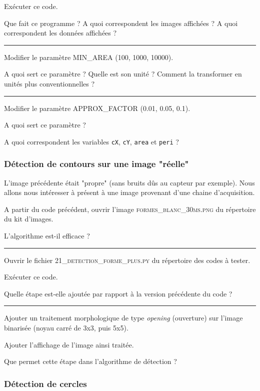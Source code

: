 \documentclass[a4paper,11pt,titlepage]{article} %
\begin{document}
\Manip Exécuter ce code.

\Quest Que fait ce programme ? A quoi correspondent les images affichées ? A quoi correspondent les données affichées ?

\noindent \rule{\linewidth}{1pt}

\Manip Modifier le paramètre MIN\_AREA (100, 1000, 10000).

\Quest A quoi sert ce paramètre ? Quelle est son unité ? Comment la transformer en unités plus conventionnelles ?

\noindent \rule{\linewidth}{1pt}

\Manip Modifier le paramètre APPROX\_FACTOR (0.01, 0.05, 0.1).

\Quest A quoi sert ce paramètre ?

\Quest A quoi correspondent les variables \texttt{cX}, \texttt{cY}, \texttt{area} et \texttt{peri} ?


\subsubsection{Détection de contours sur une image "réelle"}

L'image précédente était "propre" (sans bruits dûs au capteur par exemple). Nous allons nous intéresser à présent à une image provenant d'une chaine d'acquisition.

\Manip A partir du code précédent, ouvrir l'image \textsc{formes\_blanc\_30ms.png} du répertoire du kit d'images.

\Quest L'algorithme est-il efficace ?

\noindent \rule{\linewidth}{1pt}

\Manip Ouvrir le fichier \textsc{21\_detection\_forme\_plus.py} du répertoire des codes à tester.

\Manip Exécuter ce code.

\Quest Quelle étape est-elle ajoutée par rapport à la version précédente du code ?

\noindent \rule{\linewidth}{1pt}

\Manip Ajouter un traitement morphologique de type \textit{opening} (ouverture) sur l'image binarisée (noyau carré de 3x3, puis 5x5).

\Manip Ajouter l'affichage de l'image ainsi traitée.

\Quest Que permet cette étape dans l'algorithme de détection ? 


\subsubsection{Détection de cercles}
\end{document}
